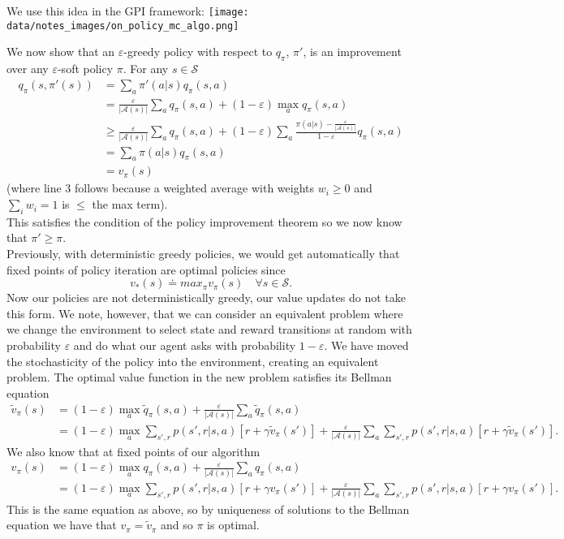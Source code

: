 We use this idea in the GPI framework:
\texttt{[image: data/notes\_images/on\_policy\_mc\_algo.png]}

We now show that an $\varepsilon$-greedy policy with respect to $q_\pi$, $\pi'$, is an improvement over any $\varepsilon$-soft policy $\pi$. For any $s \in \mathcal{S}$
\begin{align}
    q_\pi(s, \pi'(s)) &= \sum_a \pi'(a|s) q_\pi(s, a) \\ 
                      &= \frac{\varepsilon}{|\mathcal{A}(s)|} \sum_a q_\pi(s, a) + (1 - \varepsilon)\max_a q_\pi(s, a) \\
                      &\geq \frac{\varepsilon}{|\mathcal{A}(s)|} \sum_a q_\pi(s, a) + (1 - \varepsilon)\sum_a\frac{\pi(a|s) - \frac{\varepsilon}{|\mathcal{A}(s)|}}{1 - \varepsilon} q_\pi(s, a) \\
                      &= \sum_a \pi(a|s) q_\pi(s, a)\\
                      &= v_\pi(s)
\end{align}
(where line 3 follows because a weighted average with weights $w_i \geq 0$ and $\sum_i w_i = 1$ is $\leq$ the max term).\\

This satisfies the condition of the policy improvement theorem so we now know that $\pi' \geq \pi$.\\

Previously, with deterministic greedy policies, we would get automatically that fixed points of policy iteration are optimal policies since
\[
    v_*(s) \doteq max_\pi v_\pi(s) \quad \forall s \in \mathcal{S}.
\]
Now our policies are not deterministically greedy, our value updates do not take this form. We note, however, that we can consider an equivalent problem where we change the environment to select state and reward transitions at random with probability $\varepsilon$ and do what our agent asks with probability $1 - \varepsilon$. We have moved the stochasticity of the policy into the environment, creating an equivalent problem. The optimal value function in the new problem satisfies its Bellman equation
\begin{align}
    \tilde{v}_\pi(s) &= (1 - \varepsilon) \max_a \tilde{q}_\pi(s, a) + \frac{\varepsilon}{|\mathcal{A}(s)|}\sum_a \tilde{q}_\pi(s, a) \\ 
                     &= (1 - \varepsilon) \max_a \sum_{s', r} p(s', r|s, a)[r + \gamma \tilde{v}_\pi(s')] + \frac{\varepsilon}{|\mathcal{A}(s)|} \sum_a \sum_{s', r} p(s', r|s, a)[r + \gamma \tilde{v}_\pi(s')].
\end{align}
We also know that at fixed points of our algorithm
\begin{align}
    v_\pi(s) &= (1 - \varepsilon) \max_a q_\pi(s, a) + \frac{\varepsilon}{|\mathcal{A}(s)|}\sum_a q_\pi(s, a) \\ 
                     &= (1 - \varepsilon) \max_a \sum_{s', r} p(s', r|s, a)[r + \gamma v_\pi(s')] + \frac{\varepsilon}{|\mathcal{A}(s)|} \sum_a \sum_{s', r} p(s', r|s, a)[r + \gamma v_\pi(s')].
\end{align}
This is the same equation as above, so by uniqueness of solutions to the Bellman equation we have that $v_\pi = \tilde{v}_\pi$ and so $\pi$ is optimal.

